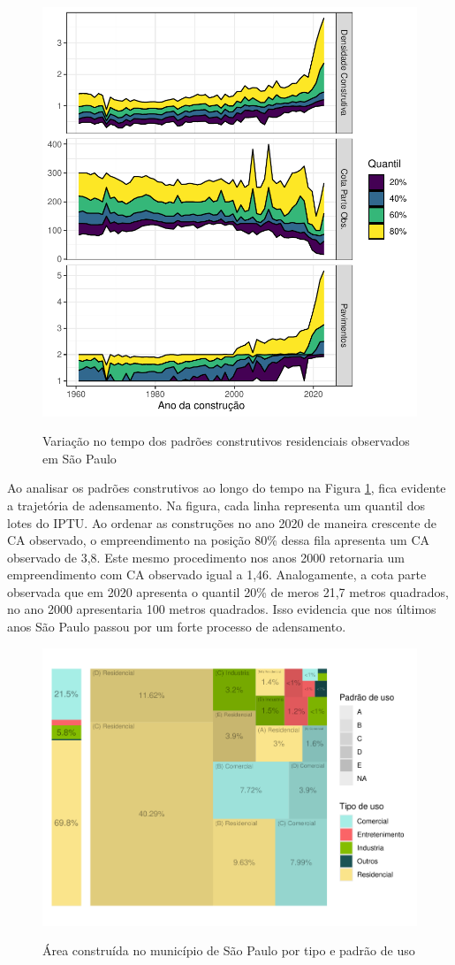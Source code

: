 \begin{apendicesenv}
\begin{figure}[h]
    \centering
    \caption{Variação no tempo dos padrões construtivos residenciais observados em São Paulo}
    \includegraphics[width = .75\linewidth]{figuras/indicadores_tempo.pdf}
    \label{fig:indicadores-tempo}
\end{figure}

Ao analisar os padrões construtivos ao longo do tempo na Figura \ref{fig:indicadores-tempo}, fica evidente a trajetória de adensamento. Na figura, cada linha representa um quantil dos lotes do IPTU. Ao ordenar as construções no ano 2020 de maneira crescente de CA observado, o empreendimento na posição 80\% dessa fila apresenta um CA observado de 3,8. Este mesmo procedimento nos anos 2000 retornaria um empreendimento com CA observado igual a 1,46. Analogamente, a cota parte observada que em 2020 apresenta o quantil 20\% de meros 21,7 metros quadrados, no ano 2000 apresentaria 100 metros quadrados. Isso evidencia que nos últimos anos São Paulo passou por um forte processo de adensamento.


\clearpage

\begin{figure}
    \centering
    \caption{Área construída no município de São Paulo por tipo e padrão de uso}
    \includegraphics[width = .8\linewidth]{figuras/tree_area_construida.pdf}
    \label{fig:area_construida}
\end{figure}


\end{apendicesenv}
